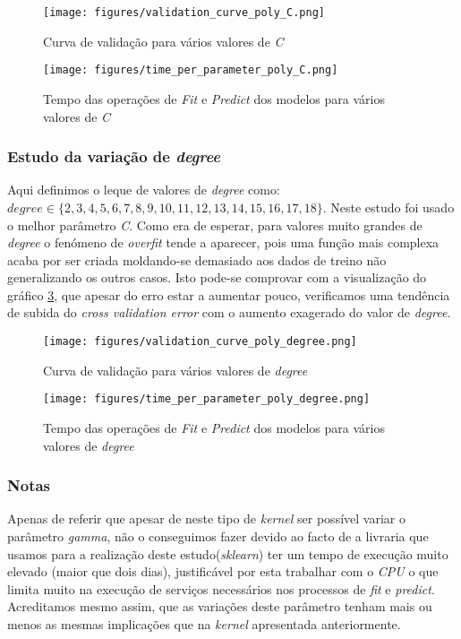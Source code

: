 \begin{figure}[htp]
\centering
\texttt{[image: figures/validation\_curve\_poly\_C.png]}
\caption{Curva de validação para vários valores de \textit{C}}
\label{fig:model_poly_C}
\end{figure}


\begin{figure}[htp]
\centering
\texttt{[image: figures/time\_per\_parameter\_poly\_C.png]}
\caption{Tempo das operações de \textit{Fit} e \textit{Predict} dos modelos para vários valores de \textit{C}}
\label{fig:time_operations_poly_C}
\end{figure}


\subsubsection{Estudo da variação de \textit{degree}}
Aqui definimos o leque de valores de \textit{degree} como:  $\textit{degree} \in \{2, 3, 4, 5, 6, 7, 8, 9, 10, 11, 12, 13, 14, 15, 16, 17, 18\}$.
Neste estudo foi usado o melhor parâmetro \textit{C}.
Como era de esperar, para valores muito grandes de \textit{degree} o fenómeno de \textit{overfit} tende a aparecer, pois uma função mais complexa acaba por ser criada moldando-se demasiado aos dados de treino não generalizando os outros casos.
Isto pode-se comprovar com a visualização do gráfico \ref{fig:model_poly_degree}, que apesar do erro estar a aumentar pouco, verificamos uma tendência de subida do \textit{cross validation error} com o aumento exagerado do valor de \textit{degree}.


\begin{figure}[htp]
\centering
\texttt{[image: figures/validation\_curve\_poly\_degree.png]}
\caption{Curva de validação para vários valores de \textit{degree}}
\label{fig:model_poly_degree}
\end{figure}


\begin{figure}[htp]
\centering
\texttt{[image: figures/time\_per\_parameter\_poly\_degree.png]}
\caption{Tempo das operações de \textit{Fit} e \textit{Predict} dos modelos para vários valores de \textit{degree}}
\label{fig:time_operations_poly_degree}
\end{figure}

\subsubsection{Notas}
Apenas de referir que apesar de neste tipo de \textit{kernel} ser possível variar o parâmetro \textit{gamma}, não o conseguimos fazer devido ao facto de a livraria que usamos para a realização deste estudo(\textit{sklearn}) ter um tempo de execução muito elevado (maior que dois dias), justificável por esta trabalhar com o \textit{CPU} o que limita muito na execução de serviços necessários nos processos de \textit{fit} e \textit{predict}.
Acreditamos mesmo assim, que as variações deste parâmetro tenham mais ou menos as mesmas implicações que na \textit{kernel} apresentada anteriormente.

